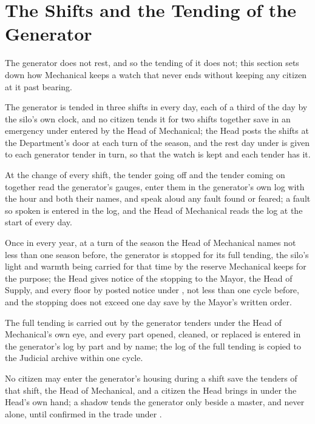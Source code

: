 \section{The Shifts and the Tending of the Generator}
\label{sec:mechanical:shifts-and-the-tending-of-the-generator}

The generator does not rest, and so the tending of it does not; this section sets down how Mechanical keeps a watch that never ends without keeping any citizen at it past bearing.

\begin{clauses}
\item The generator is tended in three shifts in every day, each of a third of the day by the silo's own clock, and no citizen tends it for two shifts together save in an emergency under  entered by the Head of Mechanical; the Head posts the shifts at the Department's door at each turn of the season, and the rest day under  is given to each generator tender in turn, so that the watch is kept and each tender has it.
\item At the change of every shift, the tender going off and the tender coming on together read the generator's gauges, enter them in the generator's own log with the hour and both their names, and speak aloud any fault found or feared; a fault so spoken is entered in the log, and the Head of Mechanical reads the log at the start of every day.
\item Once in every year, at a turn of the season the Head of Mechanical names not less than one season before, the generator is stopped for its full tending, the silo's light and warmth being carried for that time by the reserve Mechanical keeps for the purpose; the Head gives notice of the stopping to the Mayor, the Head of Supply, and every floor by posted notice under , not less than one cycle before, and the stopping does not exceed one day save by the Mayor's written order.
\item The full tending is carried out by the generator tenders under the Head of Mechanical's own eye, and every part opened, cleaned, or replaced is entered in the generator's log by part and by name; the log of the full tending is copied to the Judicial archive within one cycle.
\item No citizen may enter the generator's housing during a shift save the tenders of that shift, the Head of Mechanical, and a citizen the Head brings in under the Head's own hand; a shadow tends the generator only beside a master, and never alone, until confirmed in the trade under .
\end{clauses}

